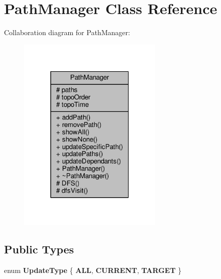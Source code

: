 \hypertarget{classPathManager}{}\section{Path\+Manager Class Reference}
\label{classPathManager}


Collaboration diagram for Path\+Manager\+:
\nopagebreak
\begin{figure}[H]
\begin{center}
\leavevmode
\includegraphics[width=196pt]{d3/d0c/classPathManager__coll__graph}
\end{center}
\end{figure}
\subsection*{Public Types}
\begin{DoxyCompactItemize}
\item 
enum {\bfseries Update\+Type} \{ {\bfseries A\+LL}, 
{\bfseries C\+U\+R\+R\+E\+NT}, 
{\bfseries T\+A\+R\+G\+ET}
 \}\hypertarget{classPathManager_a1605980621158f09cafff8d7c3228455}{}\label{classPathManager_a1605980621158f09cafff8d7c3228455}

\end{DoxyCompactItemize}
